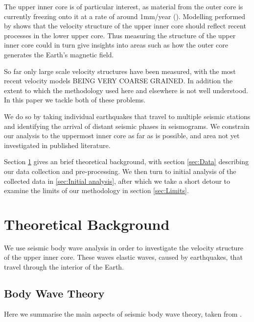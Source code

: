 \documentclass[11pt,a4paper]{article}
\begin{document}
The upper inner core is of particular interest, as material from the outer core is currently freezing onto it at a rate of around 1mm/year (\cite{Labrosse2001}). Modelling performed by \cite{Deguen2009a} shows that the velocity structure of the upper inner core should reflect recent processes in the lower upper core. Thus measuring the structure of the upper inner core could in turn give insights into areas such as how the outer core generates the Earth's magnetic field. 

So far only large scale velocity structures have been measured, with the most recent velocity models BEING VERY COARSE GRAINED. In addition the extent to which the methodology used here and elsewhere is not well understood. In this paper we tackle both of these problems.

We do so by taking individual earthquakes that travel to multiple seismic stations and identifying the arrival of distant seismic phases in seismograms. We constrain our analysis to the uppermost inner core as far as is possible, and area not yet investigated in published literature.

Section \ref{sec:Theory} gives an brief theoretical background, with section \ref{sec:Data} describing our data collection and pre-processing. We then turn to initial analysis of the collected data in \ref{sec:Initial analysis}, after which we take a short detour to examine the limits of our methodology in section \ref{sec:Limits}.

\section{Theoretical Background}
\label{sec:Theory}
We use seismic body wave analysis in order to investigate the velocity structure of the upper inner core. These waves elastic waves, caused by earthquakes, that travel through the interior of the Earth.

\subsection{Body Wave Theory}
Here we summarise the main aspects of seismic body wave theory, taken from \cite{Shearer2009}.
\end{document}
